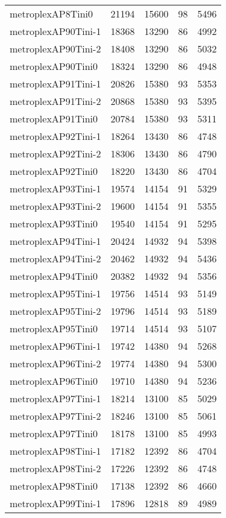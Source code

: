 \begin{longtable}{lrrrr}
metroplexAP8Tini0 & 21194 & 15600 & 98 & 5496 \\
metroplexAP90Tini-1 & 18368 & 13290 & 86 & 4992 \\
metroplexAP90Tini-2 & 18408 & 13290 & 86 & 5032 \\
metroplexAP90Tini0 & 18324 & 13290 & 86 & 4948 \\
metroplexAP91Tini-1 & 20826 & 15380 & 93 & 5353 \\
metroplexAP91Tini-2 & 20868 & 15380 & 93 & 5395 \\
metroplexAP91Tini0 & 20784 & 15380 & 93 & 5311 \\
metroplexAP92Tini-1 & 18264 & 13430 & 86 & 4748 \\
metroplexAP92Tini-2 & 18306 & 13430 & 86 & 4790 \\
metroplexAP92Tini0 & 18220 & 13430 & 86 & 4704 \\
metroplexAP93Tini-1 & 19574 & 14154 & 91 & 5329 \\
metroplexAP93Tini-2 & 19600 & 14154 & 91 & 5355 \\
metroplexAP93Tini0 & 19540 & 14154 & 91 & 5295 \\
metroplexAP94Tini-1 & 20424 & 14932 & 94 & 5398 \\
metroplexAP94Tini-2 & 20462 & 14932 & 94 & 5436 \\
metroplexAP94Tini0 & 20382 & 14932 & 94 & 5356 \\
metroplexAP95Tini-1 & 19756 & 14514 & 93 & 5149 \\
metroplexAP95Tini-2 & 19796 & 14514 & 93 & 5189 \\
metroplexAP95Tini0 & 19714 & 14514 & 93 & 5107 \\
metroplexAP96Tini-1 & 19742 & 14380 & 94 & 5268 \\
metroplexAP96Tini-2 & 19774 & 14380 & 94 & 5300 \\
metroplexAP96Tini0 & 19710 & 14380 & 94 & 5236 \\
metroplexAP97Tini-1 & 18214 & 13100 & 85 & 5029 \\
metroplexAP97Tini-2 & 18246 & 13100 & 85 & 5061 \\
metroplexAP97Tini0 & 18178 & 13100 & 85 & 4993 \\
metroplexAP98Tini-1 & 17182 & 12392 & 86 & 4704 \\
metroplexAP98Tini-2 & 17226 & 12392 & 86 & 4748 \\
metroplexAP98Tini0 & 17138 & 12392 & 86 & 4660 \\
metroplexAP99Tini-1 & 17896 & 12818 & 89 & 4989 \\

\end{longtable}
